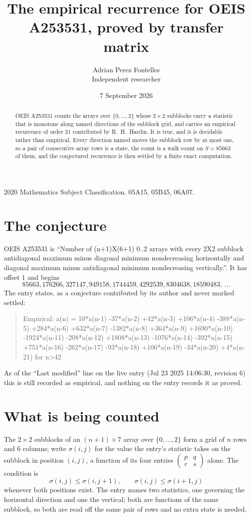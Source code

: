 \documentclass[11pt,a4paper]{article}
\title{The empirical recurrence for OEIS A253531, proved by transfer matrix}
\author{Adrian Perez Fontelles\\ \small Independent researcher}
\date{7 September 2026}
\theoremstyle{plain}
\theoremstyle{definition}
\begin{document}
\maketitle

\begin{abstract}
OEIS A253531 counts the arrays over $\{0,\dots,2\}$ whose $2\times2$ subblocks carry a
statistic that is monotone along named directions of the subblock grid, and carries an
empirical recurrence of order $21$ contributed by R.~H.~Hardin. It is true, and it is
decidable rather than empirical. Every direction named moves the subblock row by at most one,
so a pair of consecutive array rows is a state, the count is a walk count on $S=85663$ of them,
and the conjectured recurrence is then settled by a finite exact computation.
\end{abstract}

\noindent\small 2020 Mathematics Subject Classification. 05A15, 05B45, 06A07.\normalsize

\section{The conjecture}

OEIS A253531 is ``Number of (n+1)X(6+1) 0..2 arrays with every 2X2 subblock antidiagonal maximum minus diagonal minimum nondecreasing horizontally and diagonal maximum minus antidiagonal minimum nondecreasing vertically.''. It has offset $1$ and begins
\[
85663, 176266, 327147, 949158, 1744459, 4292539, 8304638, 18590483,\ \dots
\]
The entry states, as a conjecture contributed by its author and never marked settled:
\begin{quote}
Empirical: a(n) = 10*a(n-1) -37*a(n-2) +42*a(n-3) +106*a(n-4) -388*a(n-5) +284*a(n-6) +632*a(n-7) -1382*a(n-8) +364*a(n-9) +1690*a(n-10) -1924*a(n-11) -208*a(n-12) +1808*a(n-13) -1076*a(n-14) -392*a(n-15) +751*a(n-16) -262*a(n-17) -93*a(n-18) +106*a(n-19) -34*a(n-20) +4*a(n-21) for n>42
\end{quote}
As of the ``Last modified'' line on the live entry (Jul 23 2025 14:06:30, revision 6) this is still
recorded as empirical, and nothing on the entry records it as proved.

\section{What is being counted}

The $2\times2$ subblocks of an $(n+1)\times7$ array over $\{0,\dots,2\}$ form a grid
of $n$ rows and $6$ columns; write $\sigma(i,j)$ for the value the entry's statistic takes on
the subblock in position $(i,j)$, a function of its four entries
$\begin{pmatrix}p&q\\r&s\end{pmatrix}$ alone. The condition is
\[
\sigma(i,j)\le\sigma(i,j+1),\qquad \sigma(i,j)\le\sigma(i+1,j)
\]
whenever both positions exist. The entry names two statistics, one governing the horizontal direction and one the vertical; both are functions of the same subblock, so both are read off the same pair of rows and no extra state is needed.
\end{document}
